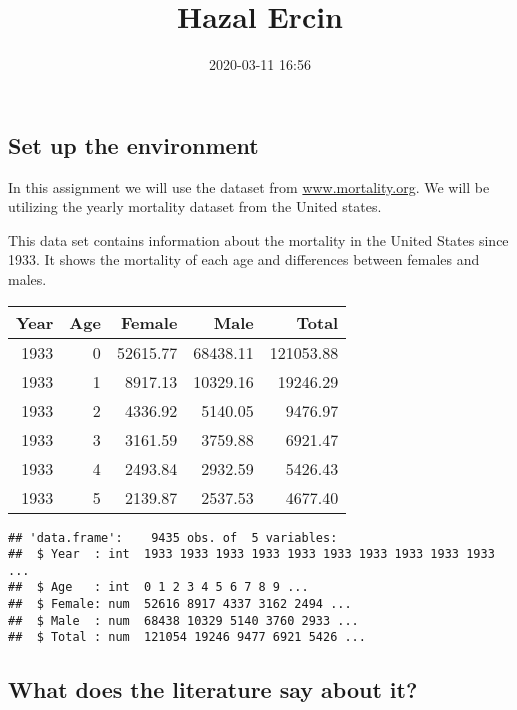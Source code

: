 \documentclass[]{article}
\title{Hazal Ercin}
\author{}
\date{2020-03-11 16:56}
\begin{document}
\maketitle

{
\hypersetup{linkcolor=black}
\setcounter{tocdepth}{2}
\tableofcontents
}
\hypertarget{set-up-the-environment}{%
\subsection{Set up the environment}\label{set-up-the-environment}}

In this assignment we will use the dataset from
\href{http://www.mortality.org}{www.mortality.org}. We will be utilizing
the yearly mortality dataset from the United states.

This data set contains information about the mortality in the United
States since 1933. It shows the mortality of each age and differences
between females and males.

\begin{table}[H]
\centering
\begin{tabular}{r|r|r|r|r}
\hline
\textbf{Year} & \textbf{Age} & \textbf{Female} & \textbf{Male} & \textbf{Total}\\
\hline
\rowcolor{gray!6}  1933 & 0 & 52615.77 & 68438.11 & 121053.88\\
\hline
1933 & 1 & 8917.13 & 10329.16 & 19246.29\\
\hline
\rowcolor{gray!6}  1933 & 2 & 4336.92 & 5140.05 & 9476.97\\
\hline
1933 & 3 & 3161.59 & 3759.88 & 6921.47\\
\hline
\rowcolor{gray!6}  1933 & 4 & 2493.84 & 2932.59 & 5426.43\\
\hline
1933 & 5 & 2139.87 & 2537.53 & 4677.40\\
\hline
\end{tabular}
\end{table}

\begin{verbatim}
## 'data.frame':    9435 obs. of  5 variables:
##  $ Year  : int  1933 1933 1933 1933 1933 1933 1933 1933 1933 1933 ...
##  $ Age   : int  0 1 2 3 4 5 6 7 8 9 ...
##  $ Female: num  52616 8917 4337 3162 2494 ...
##  $ Male  : num  68438 10329 5140 3760 2933 ...
##  $ Total : num  121054 19246 9477 6921 5426 ...
\end{verbatim}

\hypertarget{what-does-the-literature-say-about-it}{%
\subsection{What does the literature say about
it?}\label{what-does-the-literature-say-about-it}}
\end{document}
